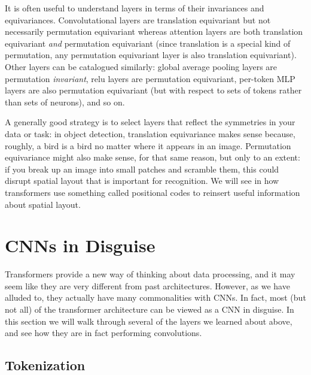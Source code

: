 It is often useful to understand layers in terms of their invariances and equivariances. Convolutational layers are translation equivariant but not necessarily permutation equivariant whereas attention layers are both translation equivariant \textit{and} permutation equivariant (since translation is a special kind of permutation, any permutation equivariant layer is also translation equivariant). %
Other layers can be catalogued similarly: global average pooling layers are permutation \textit{invariant}, relu layers are permutation equivariant, per-token MLP layers are also permutation equivariant (but with respect to sets of tokens rather than sets of neurons), and so on. %

A generally good strategy is to select layers that reflect the symmetries in your data or task: in object detection, translation equivariance makes sense because, roughly, a bird is a bird no matter where it appears in an image. Permutation equivariance might also make sense, for that same reason, but only to an extent: if you break up an image into small patches and scramble them, this could disrupt spatial layout that is important for recognition. We will see in \sect{\ref{sec:transformers:positional_encodings}} how transformers use something called positional codes to reinsert useful information about spatial layout.

\section{CNNs in Disguise} 

Transformers provide a new way of thinking about data processing, and it may seem like they are very different from past architectures. However, as we have alluded to, they actually have many commonalities with CNNs. In fact, most (but not all) of the transformer architecture can be viewed as a CNN in disguise. In this section we will walk through several of the layers we learned about above, and see how they are in fact performing convolutions.

\subsection{Tokenization}

